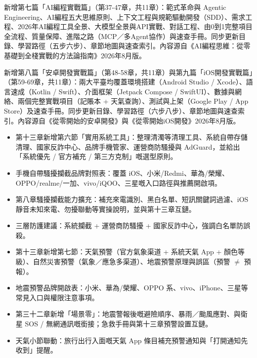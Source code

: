 
新增第七篇「AI編程實戰篇」（第37-47章，共11章）：範式革命與 Agentic Engineering、AI編程五大思維原則、上下文工程與規範驅動開發（SDD）、需求工程、2026年AI編程工具全景、大模型全景與API實戰、對話工程、由0到1完整項目全流程、質量保障、進階之路（MCP／多Agent協作）與速查手冊。同步更新目錄、學習路徑（五步六步）、章節地圖與速查索引。內容源自《AI編程思維：從零基礎到全棧實戰的方法論指南》2026年8月版。

新增第八篇「安卓開發實戰篇」（第48-58章，共11章）與第九篇「iOS開發實戰篇」（第59-69章，共11章）：兩大平臺均覆蓋環境搭建（Android Studio / Xcode）、語言速成（Kotlin / Swift）、介面框架（Jetpack Compose / SwiftUI）、數據與網絡、兩個完整實戰項目（記賬本 + 天氣查詢）、測試與上架（Google Play / App Store）及速查手冊。同步更新目錄、學習路徑（六步八步）、章節地圖與速查索引。內容源自《從零開始的安卓開發》與《從零開始iOS開發》2026年8月版。


\begin{itemize}
  \item 第十三章新增第六節「實用系統工具」：整理清濁等清理工具、系統自帶存儲清理、國家反詐中心、品牌手機管家、運營商防騷擾與 AdGuard，並給出「系統優先 / 官方補充 / 第三方克制」嘅選型原則。
  \item 手機自帶騷擾攔截品牌對照表：覆蓋 iOS、小米/Redmi、華為/榮耀、OPPO/realme/一加、vivo/iQOO、三星嘅入口路徑與推薦開啟項。
  \item 第八章騷擾攔截能力擴充：補充來電識別、黑白名單、短訊關鍵詞過濾、iOS 靜音未知來電、勿擾聯動等實操說明，並與第十三章互鏈。
  \item 三層防護建議：系統攔截 + 運營商防騷擾 + 國家反詐中心，強調白名單防誤殺。
\end{itemize}


\begin{itemize}
  \item 第十三章新增第七節：天氣預警（官方氣象渠道 + 系統天氣 App + 顏色等級）、自然災害預警（氣象／應急多渠道）、地震預警原理與誤區（預警 $\neq$ 預報）。
  \item 地震預警品牌開啟表：小米、華為/榮耀、OPPO 系、vivo、iPhone、三星等常見入口與權限注意事項。
  \item 第三十二章新增「場景零」：地震警報後嘅避險順序、暴雨／颱風應對、與衛星 SOS / 無網通訊嘅銜接；急救手冊與第十三章預警設置互鏈。
  \item 天氣小節聯動：旅行出行入面嘅天氣 App 條目補充預警通知與「打開通知先收到」提醒。
\end{itemize}

